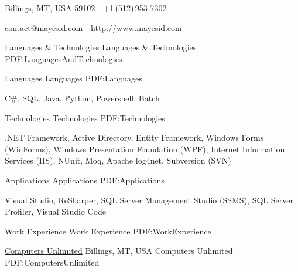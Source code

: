 \documentclass[letterpaper,MMMyyyy,nonstopmode]{simpleresumecv}
\newcommand{\CVAuthor}{Isaac Mayes}
\newcommand{\CVWebpage}{http://www.mayesid.com}
\begin{document}

\Title{\CVAuthor}

\begin{SubTitle}
\href{https://www.google.com/maps/place/Billings,+MT/}
{Billings, MT, USA 59102}
\,\SubBulletSymbol\,
\href{tel:+15129537302}
{+1\,(512)\,953-7302}
\par
\href{mailto:contact@mayesid.com}
{contact@mayesid.com}
\,\SubBulletSymbol\,
\href{\CVWebpage}
{\url{\CVWebpage}}
\end{SubTitle}

\begin{Body}


\Section
{Languages \& \newline Technologies}
{Languages \& Technologies}
{PDF:LanguagesAndTechnologies}

\SubSection
{Languages}
{Languages}
{PDF:Languages}

\BulletItem
C\#, SQL, Java, Python, Powershell, Batch

\Gap

\SubSection
{Technologies}
{Technologies}
{PDF:Technologies}

\BulletItem
.NET Framework, Active Directory, Entity Framework, Windows Forms (WinForms), Windows Presentation Foundation (WPF), Internet Information Services (IIS), NUnit, Moq, Apache log4net, Subversion (SVN)

\Gap

\SubSection
{Applications}
{Applications}
{PDF:Applications}

\BulletItem
Visual Studio, ReSharper, SQL Server Management Studio (SSMS), SQL Server Profiler, Visual Studio Code


\Section
{Work \newline Experience}
{Work Experience}
{PDF:WorkExperience}

\SubSection
{\href{http://www.cu.net}
{Computers Unlimited}
\hfill Billings, MT, USA}
{Computers Unlimited}
{PDF:ComputersUnlimited}


\end{Body}
\end{document}
